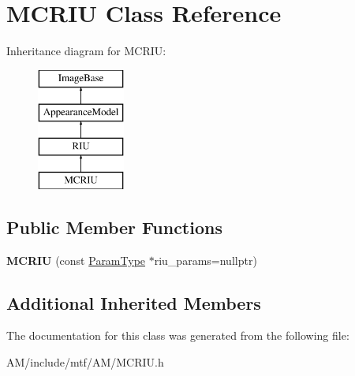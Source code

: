 \hypertarget{classMCRIU}{\section{M\-C\-R\-I\-U Class Reference}
\label{classMCRIU}
}
Inheritance diagram for M\-C\-R\-I\-U\-:\begin{figure}[H]
\begin{center}
\leavevmode
\includegraphics[height=4.000000cm]{classMCRIU}
\end{center}
\end{figure}
\subsection*{Public Member Functions}
\begin{DoxyCompactItemize}
\item 
\hypertarget{classMCRIU_a6c854661842634fa2af3d1f99038da5f}{{\bfseries M\-C\-R\-I\-U} (const \hyperlink{structRIUParams}{Param\-Type} $\ast$riu\-\_\-params=nullptr)}\label{classMCRIU_a6c854661842634fa2af3d1f99038da5f}

\end{DoxyCompactItemize}
\subsection*{Additional Inherited Members}


The documentation for this class was generated from the following file\-:\begin{DoxyCompactItemize}
\item 
A\-M/include/mtf/\-A\-M/M\-C\-R\-I\-U.\-h\end{DoxyCompactItemize}
